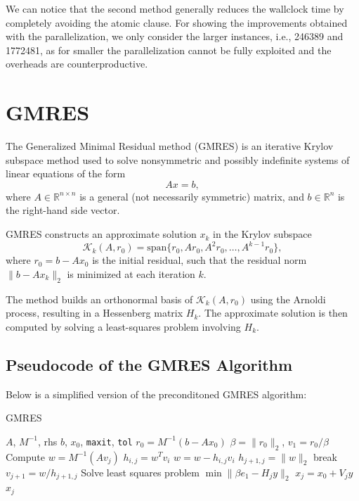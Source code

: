 \documentclass[hidelinks]{article}
\begin{document}
We can notice that the second method generally reduces the wallclock time by completely avoiding the atomic clause. 
For showing the improvements obtained with the parallelization, we only consider the larger instances, i.e., 246389 and 1772481, as for smaller the parallelization cannot be fully exploited and the overheads are counterproductive.

\section{GMRES}

The Generalized Minimal Residual method (GMRES) is an iterative Krylov subspace method used to solve nonsymmetric and possibly indefinite systems of linear equations of the form
\[
Ax = b,
\]
where \( A \in \mathbb{R}^{n \times n} \) is a general (not necessarily symmetric) matrix, and \( b \in \mathbb{R}^n \) is the right-hand side vector.

GMRES constructs an approximate solution \( x_k \) in the Krylov subspace
\[
\mathcal{K}_k(A, r_0) = \text{span} \{ r_0, Ar_0, A^2r_0, \dots, A^{k-1}r_0 \},
\]
where \( r_0 = b - Ax_0 \) is the initial residual, such that the residual norm \( \| b - Ax_k \|_2 \) is minimized at each iteration \( k \).

The method builds an orthonormal basis of \( \mathcal{K}_k(A, r_0) \) using the Arnoldi process, resulting in a Hessenberg matrix \( H_k \). The approximate solution is then computed by solving a least-squares problem involving \( H_k \).

\subsection{Pseudocode of the GMRES Algorithm}

Below is a simplified version of the preconditoned GMRES algorithm:

\begin{algorithm}[H]
\caption{GMRES}
\begin{algorithmic}
\Require $A$, $M^{-1}$, rhs $b$, $x_0$, \texttt{maxit}, \texttt{tol}
\State \( r_0 = M^{-1}(b - Ax_0) \)
\State \( \beta = \|r_0\|_2 \), \( v_1 = r_0 / \beta \)
    \State Compute \( w = M^{-1}(Av_j) \)
        \State \( h_{i,j} = w^T v_i \)
        \State \( w = w - h_{i,j} v_i \)
    \EndFor
    \State \( h_{j+1,j} = \|w\|_2 \)
     
        \State break
    \EndIf
    \State \( v_{j+1} = w / h_{j+1,j} \)
    \State Solve least squares problem \( \min \| \beta e_1 - H_j y \|_2 \)
    \State \( x_j = x_0 + V_j y \)
        \State \Return \( x_j \)
    \EndIf
\EndFor
\end{algorithmic}
\end{algorithm}
\end{document}
